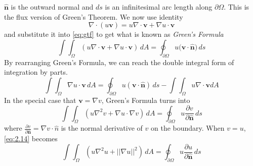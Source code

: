 \documentclass{article}
\newcommand{\pd}[2]{\frac{\partial #1}{\partial #2}}
\newcommand{\vb}[1]{\mathbf{ #1}}
\newcommand{\lap}{\nabla ^2}
\newcommand{\dive}[1]{\nabla \cdot \vb{#1}}
\newcommand{\pull}{\! \! \!}
\newcommand{\dint}{\int \pull \int}
\newcommand{\un}{\mathbf{\hat{n}}}
\numberwithin{equation}{section}
\begin{document}
$\un$ is the outward normal and $ds$ is an infinitesimal arc length along $\partial \Omega$. This is the flux version of Green's Theorem.
We now use identity
\begin{equation}
    \nabla \cdot (u \mathbf{v}) = u\dive{\vb{v}} +\nabla u\cdot\vb{v} \label{eq:2.11}
\end{equation}
and substitute it into \eqref{eq:gtf} to get what is known as \textit{Green's Formula}
\begin{equation}
    \dint_\Omega (u\dive{\vb{v}} +\nabla u\cdot\vb{v})\,dA = \oint_{\partial \Omega}u(\vb{v \cdot \un)}\,ds \label{eq:gf}
\end{equation}
By rearranging Green's Formula, we can reach the double integral form of integration by parts.
\begin{equation}
    \dint_\Omega \nabla u\cdot\vb{v} \,dA = \oint_{\partial \Omega}u(\vb{v\cdot \un})\, ds -\dint_\Omega u\dive{v} dA \label{eq:dibp}
\end{equation}
In the special case that $\vb{v} = \nabla v$, Green's Formula turns into 
\begin{equation}
    \dint_\Omega (u\lap v+\nabla u \cdot \nabla v) \,dA = \oint_{\partial \Omega}u\pd{v}{\un}\,ds \label{eq:2.14}
\end{equation}
where $\pd{v}{\un}=\nabla v\cdot\hat{n}$ is the normal derivative of $v$ on the boundary. When $v=u$, \eqref{eq:2.14} becomes 
\begin{equation}
    \dint_\Omega(u\lap u + ||\nabla u||^2)\,dA = \oint_{\partial \Omega}u\pd{u}{\un}\,ds \label{eq:2.15}
\end{equation}
\end{document}
